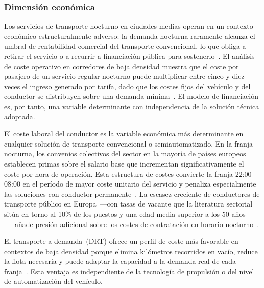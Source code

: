 \subsubsection{Dimensión económica}
\label{sec:pestel-economica}

Los servicios de transporte nocturno en ciudades medias operan 
en un contexto económico estructuralmente adverso: la demanda 
nocturna raramente alcanza el umbral de rentabilidad comercial 
del transporte convencional, lo que obliga a retirar el 
servicio o a recurrir a financiación pública para 
sostenerlo~\parencite{Estrada2021}. El análisis de coste 
operativo en corredores de baja densidad muestra que el 
coste por pasajero de un servicio regular nocturno puede 
multiplicar entre cinco y diez veces el ingreso generado por 
tarifa, dado que los costes fijos del vehículo y del conductor 
se distribuyen sobre una demanda mínima~\parencite{UITP2024}. 
El modelo de financiación es, por tanto, una variable 
determinante con independencia de la solución técnica adoptada.

El coste laboral del conductor es la variable económica más 
determinante en cualquier solución de transporte convencional 
o semiautomatizado. En la franja nocturna, los convenios 
colectivos del sector en la mayoría de países europeos 
establecen primas sobre el salario base que incrementan 
significativamente el coste por hora de operación. Esta 
estructura de costes convierte la franja 22:00--08:00 en el 
período de mayor coste unitario del servicio y penaliza 
especialmente las soluciones con conductor 
permanente~\parencite{UITP2024}. La escasez creciente de 
conductores de transporte público en Europa~---con tasas de 
vacante que la literatura sectorial sitúa en torno al 10\% 
de los puestos y una edad media superior a los 50 
años---~añade presión adicional sobre los costes de 
contratación en horario 
nocturno~\parencite{K2Centrum2025DRT}.

El transporte a demanda~(DRT) ofrece un perfil de coste más 
favorable en contextos de baja densidad porque elimina 
kilómetros recorridos en vacío, reduce la flota necesaria 
y puede adaptar la capacidad a la demanda real de cada 
franja~\parencite{Estrada2021}. Esta ventaja es independiente 
de la tecnología de propulsión o del nivel de automatización 
del vehículo.

